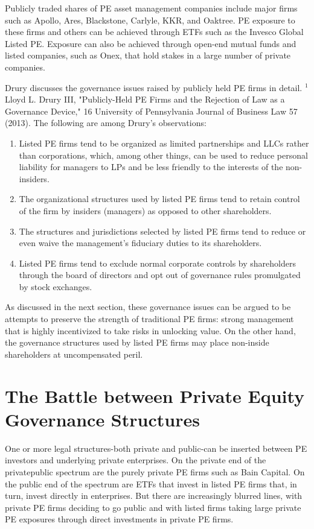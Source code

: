 \documentclass[11pt]{article}
\begin{document}
Publicly traded shares of PE asset management companies include major firms such as Apollo, Ares, Blackstone, Carlyle, KKR, and Oaktree. PE exposure to these firms and others can be achieved through ETFs such as the Invesco Global Listed PE. Exposure can also be achieved through open-end mutual funds and listed companies, such as Onex, that hold stakes in a large number of private companies.

Drury discusses the governance issues raised by publicly held PE firms in detail. ${ }^{1}$ Lloyd L. Drury III, "Publicly-Held PE Firms and the Rejection of Law as a Governance Device," 16 University of Pennsylvania Journal of Business Law 57 (2013). The following are among Drury's observations:

\begin{enumerate}
  \item Listed PE firms tend to be organized as limited partnerships and LLCs rather than corporations, which, among other things, can be used to reduce personal liability for managers to LPs and be less friendly to the interests of the non-insiders.

  \item The organizational structures used by listed PE firms tend to retain control of the firm by insiders (managers) as opposed to other shareholders.

  \item The structures and jurisdictions selected by listed PE firms tend to reduce or even waive the management's fiduciary duties to its shareholders.

  \item Listed PE firms tend to exclude normal corporate controls by shareholders through the board of directors and opt out of governance rules promulgated by stock exchanges.

\end{enumerate}

As discussed in the next section, these governance issues can be argued to be attempts to preserve the strength of traditional PE firms: strong management that is highly incentivized to take risks in unlocking value. On the other hand, the governance structures used by listed PE firms may place non-inside shareholders at uncompensated peril.

\section*{The Battle between Private Equity Governance Structures}
One or more legal structures-both private and public-can be inserted between PE investors and underlying private enterprises. On the private end of the privatepublic spectrum are the purely private PE firms such as Bain Capital. On the public end of the spectrum are ETFs that invest in listed PE firms that, in turn, invest directly in enterprises. But there are increasingly blurred lines, with private PE firms deciding to go public and with listed firms taking large private PE exposures through direct investments in private PE firms.
\end{document}

